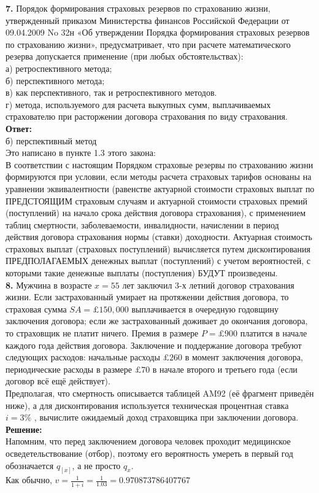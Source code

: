 \documentclass{article}
\begin{document}
  
  
 {\bf \large 7.} Порядок формирования страховых резервов по страхованию жизни, утвержденный приказом Министерства финансов Российской Федерации от 09.04.2009 No 32н «Об утверждении Порядка формирования страховых резервов по страхованию жизни», предусматривает, что при расчете математического резерва допускается применение (при любых обстоятельствах):\\
а) ретроспективного метода;\\
б) перспективного метода;\\
в) как перспективного, так и ретроспективного методов.\\
г) метода, используемого для расчета выкупных сумм, выплачиваемых страхователю при расторжении договора страхования по виду страхования.\\

{\bf \large Ответ:}\\ б) перспективный метод\\
Это написано в пункте 1.3 этого закона:\\
 В соответствии с настоящим Порядком страховые резервы по страхованию жизни формируются при условии, если методы расчета страховых тарифов основаны на уравнении эквивалентности (равенстве актуарной стоимости страховых выплат по ПРЕДСТОЯЩИМ  страховым случаям и актуарной стоимости страховых премий (поступлений) на начало срока действия договора страхования), с применением таблиц смертности, заболеваемости, инвалидности, начислении в период действия договора страхования нормы (ставки) доходности. Актуарная стоимость страховых выплат (страховых поступлений) вычисляется путем дисконтирования ПРЕДПОЛАГАЕМЫХ денежных выплат (поступлений) с учетом вероятностей, с которыми такие денежные выплаты (поступления) БУДУТ произведены.\\


  
  
 {\bf \large 8.} Мужчина в возрасте $x = 55$ лет заключил 3-х летний договор страхования жизни. Если застрахованный умирает на протяжении действия договора, то страховая сумма $SA = \pounds 150,000$ выплачивается в очередную годовщину заключения договора; если же застрахованный доживает до окончания договора, то страховщик не платит ничего. Премия в размере $P = \pounds 900$ платится в начале каждого года действия договора. Заключение и поддержание договора требуют следующих расходов: начальные расходы $\pounds260$ в момент заключения договора, периодические расходы в размере $\pounds 70$ в начале второго и третьего года (если договор всё ещё действует).\\
Предполагая, что смертность описывается таблицей AM92 (её фрагмент приведён ниже), а для дисконтирования используется техническая процентная ставка
$i = 3\%$ , вычислите ожидаемый доход страховщика при заключении договора.\\
{\bf \large Решение:}\\
Напомним, что перед заключением договора человек проходит медицинское осведетельствование (отбор),
 поэтому его вероятность умереть в первый год обозначается $q_{[x]}$, а не просто $q_x$.\\
 Как обычно, $v=\frac{1}{1+i} = \frac{1}{1.03} = 0.970873786407767$\\
 
\end{document}
